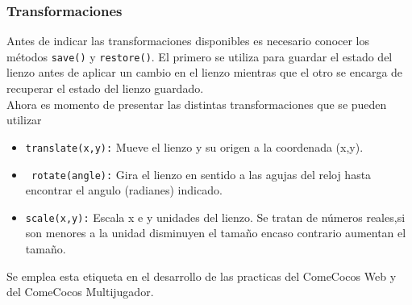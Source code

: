 \subsubsection*{Transformaciones}
Antes de indicar las transformaciones disponibles es necesario conocer los métodos \texttt{save()} y \texttt{restore()}. El primero se utiliza para guardar el estado del lienzo antes de aplicar un cambio en el lienzo mientras que el otro se encarga de recuperar el estado del lienzo guardado.
\\Ahora es momento de presentar las distintas transformaciones que se pueden utilizar
\begin{itemize}
\item \texttt{translate(x,y):} Mueve el lienzo y su origen a la coordenada (x,y).
\item\texttt{ rotate(angle):} Gira el lienzo en sentido a las agujas del reloj hasta encontrar el angulo (radianes) indicado.
\item \texttt{scale(x,y):} Escala x e y unidades del lienzo. Se tratan de números reales,si son menores a la unidad disminuyen el tamaño encaso contrario aumentan el tamaño.
\end{itemize}
Se emplea esta etiqueta en el desarrollo de las practicas del ComeCocos Web y del ComeCocos Multijugador.
